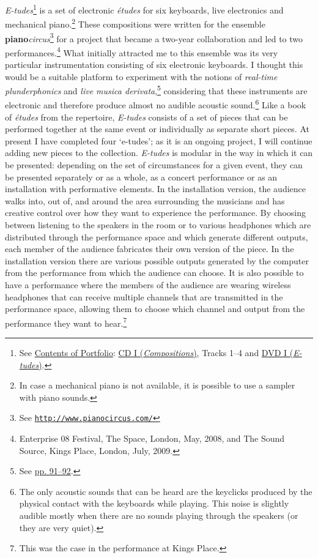 \emph{E-tudes}\footnote{See \hyperlink{portfolio}{Contents of Portfolio}: \href{http://www.federicoreuben.com/phd/?page_id=26}{CD I (\emph{Compositions})}, Tracks 1--4 and \href{http://www.federicoreuben.com/phd/etudes}{DVD I (\emph{E-tudes})}.} is a set of electronic \emph{\'{e}tudes} for six keyboards, live electronics and mechanical piano.\footnote{In case a mechanical piano is not available, it is possible to use a sampler with piano sounds.} These compositions were written for the ensemble \textbf{piano}\emph{circus}\footnote{See \href{http://www.pianocircus.com/}{\texttt{http://www.pianocircus.com/}}} for a project that became a \mbox{two-year} collaboration and led to two performances.\footnote{Enterprise 08 Festival, The Space, London, May, 2008, and The Sound Source, Kings Place, London, July, 2009.} What initially attracted me to this ensemble was its very particular instrumentation consisting of six electronic keyboards. I thought this would be a suitable platform to experiment with the notions of \emph{real-time plunderphonics} and \emph{live musica derivata},\footnote{See \hyperlink{realtimeplunderfuck}{pp. 91--92}.} considering that these instruments are electronic and therefore produce almost no audible acoustic sound.\footnote{The only acoustic sounds that can be heard are the keyclicks produced by the physical contact with the keyboards while playing. This noise is slightly audible mostly when there are no sounds playing through the speakers (or they are very quiet).} Like a book of \emph{\'{e}tudes} from the repertoire, \emph{E-tudes} consists of a set of pieces that can be performed together at the same event or individually as separate short pieces. At present I have completed four `e-tudes'; as it is an ongoing project, I will continue adding new pieces to the collection. \emph{E-tudes} is modular in the way in which it can be presented: depending on the set of circumstances for a given event, they can be presented separately or as a whole, as a concert performance or as an installation with performative elements. In the installation version, the audience walks into, out of, and around the area surrounding the musicians and has creative control over how they want to experience the performance. By choosing between listening to the speakers in the room or to various headphones which are distributed through the performance space and which generate different outputs, each member of the audience fabricates their own version of the piece. In the installation version there are various possible outputs generated by the computer from the performance from which the audience can choose. It is also possible to have a performance where the members of the audience are wearing wireless headphones that can receive multiple channels that are transmitted in the performance space, allowing them to choose which channel and output from the performance they want to hear.\footnote{This was the case in the performance at Kings Place.}

